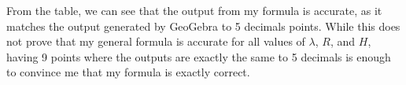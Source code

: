 From the table, we can see that the output from my formula is accurate, as it matches the output generated by GeoGebra to 5 decimals points. While this does not prove that my general formula is accurate for all values of $\lambda$, $R$, and $H$, having 9 points where the outputs are exactly the same to 5 decimals is enough to convince me that my formula is exactly correct.
